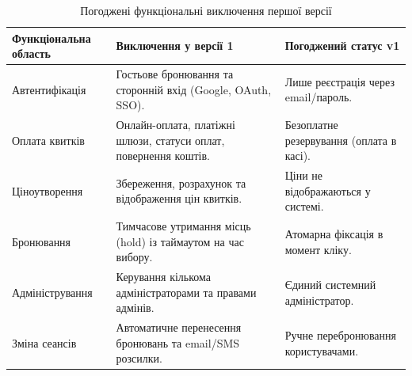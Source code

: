 \begin{table}[htbp]
\caption{Погоджені функціональні виключення першої версії}\label{tab:v1-exclusions}
\centering
\begin{tabularx}{\textwidth}{@{}l L L@{}}
\toprule
\textbf{Функціональна область} & \textbf{Виключення у версії 1} & \textbf{Погоджений статус v1} \\
\midrule
Автентифікація & Гостьове бронювання та сторонній вхід (Google, OAuth, SSO). & Лише реєстрація через email/пароль. \\
Оплата квитків & Онлайн-оплата, платіжні шлюзи, статуси оплат, повернення коштів. & Безоплатне резервування (оплата в касі). \\
Ціноутворення & Збереження, розрахунок та відображення цін квитків. & Ціни не відображаються у системі. \\
Бронювання & Тимчасове утримання місць (hold) із таймаутом на час вибору. & Атомарна фіксація в момент кліку. \\
Адміністрування & Керування кількома адміністраторами та правами адмінів. & Єдиний системний адміністратор. \\
Зміна сеансів & Автоматичне перенесення бронювань та email/SMS розсилки. & Ручне перебронювання користувачами. \\
\bottomrule
\end{tabularx}
\end{table}
